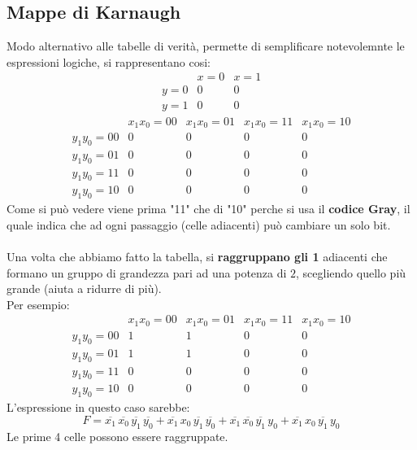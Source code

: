 \documentclass[12pt,a4paper]{article}
\begin{document}
\subsection{Mappe di Karnaugh}
Modo alternativo alle tabelle di verità, permette di semplificare notevolemnte le espressioni logiche, si rappresentano cosi:
\[
\begin{array}{c|c|c}
 & x=0 & x=1 \\ \hline
y=0 & 0 & 0 \\ \hline
y=1 & 0 & 0
\end{array}
\]
\[
\begin{array}{c|cccc}
 & x_1x_0=00 & x_1x_0=01 & x_1x_0=11 & x_1x_0=10 \\ \hline
y_1y_0=00 & 0 & 0 & 0 & 0 \\ \hline
y_1y_0=01 & 0 & 0 & 0 & 0 \\ \hline
y_1y_0=11 & 0 & 0 & 0 & 0 \\ \hline
y_1y_0=10 & 0 & 0 & 0 & 0
\end{array}
\]
Come si può vedere viene prima "11" che di "10" perche si usa il \textbf{codice Gray}, il quale indica che ad ogni passaggio (celle adiacenti) può cambiare un solo bit.\\\\
Una volta che abbiamo fatto la tabella, si \textbf{raggruppano gli 1} adiacenti che formano un gruppo di grandezza pari ad una potenza di $2$, scegliendo quello più grande (aiuta a ridurre di più).\\
Per esempio:
\[
\begin{array}{c|cccc}
 & x_1x_0=00 & x_1x_0=01 & x_1x_0=11 & x_1x_0=10 \\ \hline
y_1y_0=00 & 1 & 1 & 0 & 0 \\ \hline
y_1y_0=01 & 1 & 1 & 0 & 0 \\ \hline
y_1y_0=11 & 0 & 0 & 0 & 0 \\ \hline
y_1y_0=10 & 0 & 0 & 0 & 0
\end{array}
\]
L'espressione in questo caso sarebbe:
\[
F =
\overline{x_1}\,\overline{x_0}\,\overline{y_1}\,\overline{y_0}
+
\overline{x_1}\,x_0\,\overline{y_1}\,\overline{y_0}
+
\overline{x_1}\,\overline{x_0}\,\overline{y_1}\,y_0
+
\overline{x_1}\,x_0\,\overline{y_1}\,y_0
\]
Le prime 4 celle possono essere raggruppate.
\end{document}
